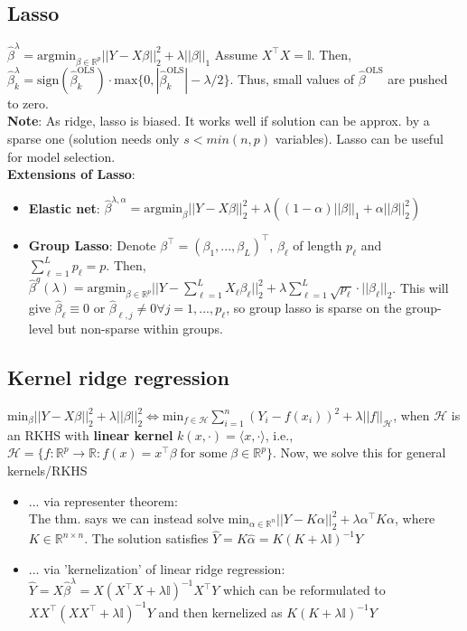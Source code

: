 \subsection*{Lasso} 
$\hat{\beta}^\lambda = \text{argmin}_{\beta \in \mathbb{R}^p} ||Y-X\beta||_2^2 + \lambda||\beta||_1$ Assume $X^\intercal X = \mathbb{I}$. Then, \\ $\hat{\beta}_k^\lambda = \text{sign}(\hat{\beta}^\text{OLS}_k) \cdot \text{max} \{0, |\hat{\beta}_k^\text{OLS}| -\lambda/2\}$. Thus, small values of $\hat{\beta}^\text{OLS}$ are pushed to zero. \\
\textbf{Note}: As ridge, lasso is biased. It works well if solution can be approx. by a sparse one (solution needs only $s < min(n,p)$ variables). Lasso can be useful for model selection.\\
\textbf{Extensions of Lasso}:
\begin{itemize}
    \item \textbf{Elastic net}: $\hat{\beta}^{\lambda,\alpha}=\text{argmin}_{\beta}||Y-X\beta||^2_2 + \lambda \left((1-\alpha) ||\beta||_1 + \alpha ||\beta||_2^2\right)$
    \item \textbf{Group Lasso}: Denote $\beta^\intercal = (\beta_1,...,\beta_L)^\intercal$, $\beta_\ell$ of length $p_\ell$ and $\sum_{\ell=1}^L p_\ell = p$. Then, $\hat{\beta}^g(\lambda) = \text{argmin}_{\beta \in \mathbb{R}^p} ||Y - \sum_{\ell=1}^L X_\ell \beta_\ell||_2^2 + \lambda \sum_{\ell=1}^L \sqrt{p_\ell}\cdot ||\beta_\ell||_2$. This will give $\hat{\beta}_\ell \equiv 0$ or $\hat{\beta}_{\ell,j} \neq 0 \forall j=1,...,p_\ell$, so group lasso is sparse on the group-level but non-sparse within groups.
\end{itemize}
\subsection*{Kernel ridge regression}

$\text{min}_\beta ||Y-X\beta||^2_2 + \lambda ||\beta||^2_2 \iff \text{min}_{f \in \mathcal{H}} \sum_{i=1}^n (Y_i - f(x_i))^2 + \lambda ||f||_\mathcal{H}$, when $\mathcal{H}$ is an RKHS with \textbf{linear kernel} $k(x, \cdot) = \langle x, \cdot \rangle$, i.e., $\mathcal{H} = \{ f: \mathbb{R}^p \to \mathbb{R} \colon f(x) = x^\intercal \beta  \; \text{for some} \; \beta \in \mathbb{R}^p \}$. Now, we solve this for general kernels/RKHS

\begin{itemize}
    \item ... via representer theorem: \\
    The thm. says we can instead solve $\text{min}_{\alpha \in \mathbb{R}^n} ||Y - K\alpha||^2_2 + \lambda\alpha^\intercal K\alpha$, where $K \in \mathbb{R}^{n\times n}$. The solution satisfies $\hat{Y} = K\hat{\alpha} = K(K + \lambda \mathds{I})^{-1}Y$
    \item ... via 'kernelization' of linear ridge regression: \\
    $\hat{Y} = X\hat{\beta}^\lambda = X(X^\intercal X + \lambda \mathds{I})^{-1}X^\intercal Y$ which can be reformulated to $ X X^\intercal(X X^\intercal + \lambda \mathds{I})^{-1}Y$ and then kernelized as $K(K + \lambda \mathds{I})^{-1}Y$
\end{itemize}
